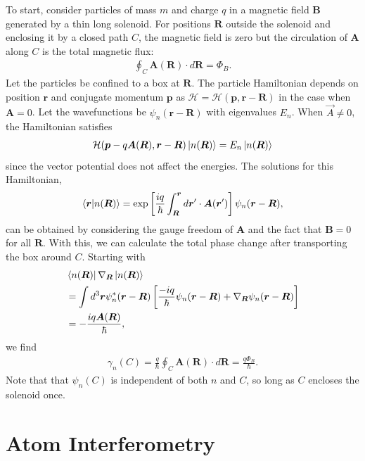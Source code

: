 \documentclass[reprint,
nofootinbib,
amsmath,amssymb,
aps]{revtex4-1}
\newcommand{\f}[2]{\frac{#1}{#2}}
\newcommand{\lb}{\left[}
\newcommand{\rb}{\right]}
\begin{document}
To start, consider particles of mass $m$ and charge $q$ in a magnetic field $\bm{B}$ generated by a thin long solenoid. For positions $\bm{R}$ outside the solenoid and enclosing it by a closed path $C$, the magnetic field is zero but the circulation of $\bm{A}$ along $C$ is the total magnetic flux:
\begin{align*}
\oint_C \bm{A}(\bm{R}) \cdot d\bm{R} = \Phi_B.
\end{align*}
Let the particles be confined to a box at $\bm{R}$. The particle Hamiltonian depends on position ${\bm{r}}$ and conjugate momentum $\bm{p}$ as $\mathcal{H} = \mathcal{H}(\bm{p}, \bm{r} - \bm{R})$ in the case when $\bm{A} = 0$. Let the wavefunctions be $\psi_n(\bm{r} - \bm{R})$ with eigenvalues $E_n$.  When $\vec{A} \neq 0$, the Hamiltonian satisfies
\begin{align*}
\mathcal{H}(\bm{p}-q\bm{A}(\bm{R}), \bm{r}- \bm{R}) \ket{n(\bm{R})} = E_n \ket{n(\bm{R})}
\end{align*}
since the vector potential does not affect the energies. The solutions for this Hamiltonian,
\begin{align*}
\bra{\bm{r}} \ket{n(\bm{R})} = \exp\lb \f{iq}{\hbar} \int_{\bm{R}}^{\bm{r}} d\bm{r}'\cdot \bm{A}(\bm{r}') \rb \psi_n(\bm{r} - \bm{R}),
\end{align*}
can be obtained by considering the gauge freedom of $\bm{A}$ and the fact that $\bm{B}=0$ for all $\bm{R}$. With this, we can calculate the total phase change after transporting the box around $C$. Starting with
\begin{align*}
&\bra{n(\bm{R})} \nabla_{\bm{R}} \ket{n(\bm{R})}\\
&= \int d^3\bm{r}\psi^*_n(\bm{r} - \bm{R}) \lb \f{-iq}{\hbar}\psi_n(\bm{r} - \bm{R}) + \nabla_{\bm{R}} \psi_n(\bm{r} - \bm{R}) \rb\\
&= -\f{iq\bm{A}(\bm{R})}{\hbar},
\end{align*}
we find 
\begin{align*}
\gamma_n(C) = \f{q}{\hbar}\oint_C \bm{A}(\bm{R}) \cdot d\bm{R} = \f{q\Phi_B}{\hbar}.
\end{align*}
Note that that $\psi_n(C)$ is independent of both $n$ and $C$, so long as $C$ encloses the solenoid once.



\section{Atom Interferometry} \label{sect:2}
\end{document}
